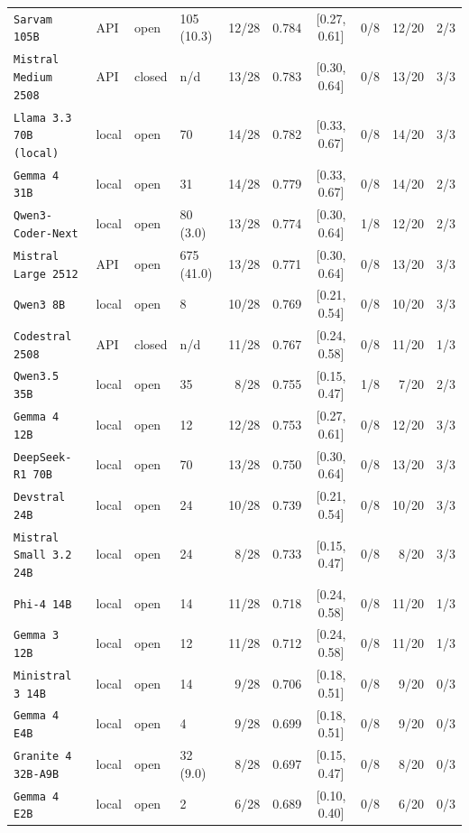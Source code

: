 \begin{table}[!htbp]
\begin{tabular}{@{}llllrrcrrr@{}}
\texttt{Sarvam 105B} & API & open & 105 (10.3) & 12/28 & 0.784 & [0.27, 0.61] & 0/8 & 12/20 & 2/3 \\
\texttt{Mistral Medium 2508} & API & closed & n/d & 13/28 & 0.783 & [0.30, 0.64] & 0/8 & 13/20 & 3/3 \\
\texttt{Llama 3.3 70B (local)} & local & open & 70 & 14/28 & 0.782 & [0.33, 0.67] & 0/8 & 14/20 & 3/3 \\
\texttt{Gemma 4 31B} & local & open & 31 & 14/28 & 0.779 & [0.33, 0.67] & 0/8 & 14/20 & 2/3 \\
\texttt{Qwen3-Coder-Next} & local & open & 80 (3.0) & 13/28 & 0.774 & [0.30, 0.64] & 1/8 & 12/20 & 2/3 \\
\texttt{Mistral Large 2512} & API & open & 675 (41.0) & 13/28 & 0.771 & [0.30, 0.64] & 0/8 & 13/20 & 3/3 \\
\texttt{Qwen3 8B} & local & open & 8 & 10/28 & 0.769 & [0.21, 0.54] & 0/8 & 10/20 & 3/3 \\
\texttt{Codestral 2508} & API & closed & n/d & 11/28 & 0.767 & [0.24, 0.58] & 0/8 & 11/20 & 1/3 \\
\texttt{Qwen3.5 35B} & local & open & 35 & 8/28 & 0.755 & [0.15, 0.47] & 1/8 & 7/20 & 2/3 \\
\texttt{Gemma 4 12B} & local & open & 12 & 12/28 & 0.753 & [0.27, 0.61] & 0/8 & 12/20 & 3/3 \\
\texttt{DeepSeek-R1 70B} & local & open & 70 & 13/28 & 0.750 & [0.30, 0.64] & 0/8 & 13/20 & 3/3 \\
\texttt{Devstral 24B} & local & open & 24 & 10/28 & 0.739 & [0.21, 0.54] & 0/8 & 10/20 & 3/3 \\
\texttt{Mistral Small 3.2 24B} & local & open & 24 & 8/28 & 0.733 & [0.15, 0.47] & 0/8 & 8/20 & 3/3 \\
\texttt{Phi-4 14B} & local & open & 14 & 11/28 & 0.718 & [0.24, 0.58] & 0/8 & 11/20 & 1/3 \\
\texttt{Gemma 3 12B} & local & open & 12 & 11/28 & 0.712 & [0.24, 0.58] & 0/8 & 11/20 & 1/3 \\
\texttt{Ministral 3 14B} & local & open & 14 & 9/28 & 0.706 & [0.18, 0.51] & 0/8 & 9/20 & 0/3 \\
\texttt{Gemma 4 E4B} & local & open & 4 & 9/28 & 0.699 & [0.18, 0.51] & 0/8 & 9/20 & 0/3 \\
\texttt{Granite 4 32B-A9B} & local & open & 32 (9.0) & 8/28 & 0.697 & [0.15, 0.47] & 0/8 & 8/20 & 0/3 \\
\texttt{Gemma 4 E2B} & local & open & 2 & 6/28 & 0.689 & [0.10, 0.40] & 0/8 & 6/20 & 0/3 \\

\end{tabular}
\end{table}

